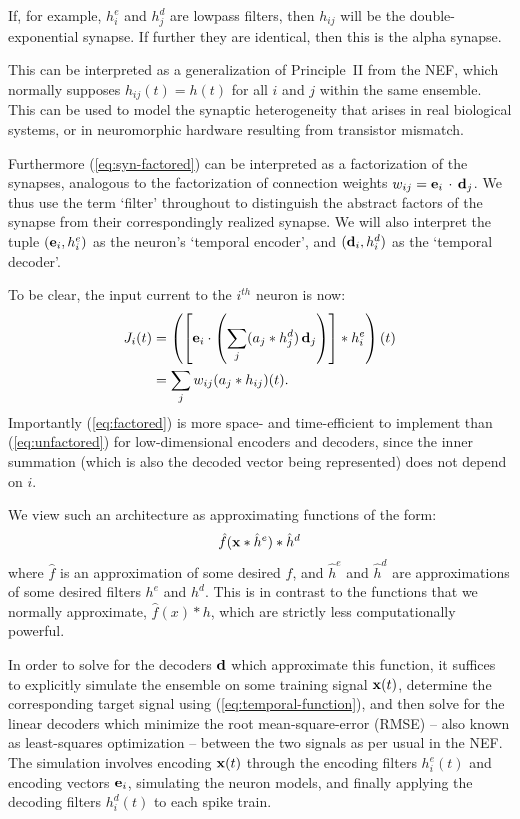 If, for example, $h^e_i$ and $h^d_j$ are lowpass filters, then $h_{ij}$ will be the double-exponential synapse. If further  they are identical, then this is the alpha synapse.

This can be interpreted as a generalization of Principle~II from the NEF, which normally supposes $h_{ij}(t) = h(t)$ for all $i$ and $j$ within the same ensemble.
This can be used to model the synaptic heterogeneity that arises in real biological systems, or in neuromorphic hardware resulting from transistor mismatch. 

Furthermore (\ref{eq:syn-factored}) can be interpreted as a factorization of the synapses, analogous to the factorization of connection weights \mbox{$w_{ij} = \mathbf{e}_i \, \cdot \, \mathbf{d}_j$}.
We thus use the term `filter' throughout to distinguish the abstract factors of the synapse from their correspondingly realized synapse.
We will also interpret the tuple $(\mathbf{e}_i, h^e_i)$ as the neuron's `temporal encoder', and $(\mathbf{d}_i, h^d_i)$ as the `temporal decoder'.

To be clear, the input current to the $i^{th}$ neuron is now:
\begin{align}
J_i(t) &= \left( \left[ \mathbf{e}_i \cdot \left( \sum_j ( a_j \ast h^d_j) \, \mathbf{d}_j \right) \right] \ast h^e_i \right)(t) \label{eq:factored} \\
       &= \sum_j w_{ij} (a_j \ast h_{ij})(t) . \label{eq:unfactored}
\end{align}
Importantly (\ref{eq:factored}) is more space- and time-efficient to implement than (\ref{eq:unfactored}) for low-dimensional encoders and decoders, since the inner summation (which is also the decoded vector being represented) does not depend on $i$.

We view such an architecture as approximating functions of the form:
\begin{equation} \label{eq:temporal-function}
\hat{f}(\mathbf{x} \ast \hat{h}^e) \ast \hat{h}^d
\end{equation}
where $\hat{f}$ is an approximation of some desired $f$, and $\hat{h}^e$ and $\hat{h}^d$ are approximations of some desired filters $h^e$ and $h^d$.
This is in contrast to the functions that we normally approximate, $\hat{f}(x) \ast h$, which are strictly less computationally powerful.

In order to solve for the decoders $\mathbf{d}$ which approximate this function, it suffices to explicitly simulate the ensemble on some training signal $\mathbf{x}(t)$, determine the corresponding target signal using (\ref{eq:temporal-function}), and then solve for the linear decoders which minimize the root mean-square-error (RMSE) -- also known as least-squares optimization -- between the two signals as per usual in the NEF.
The simulation involves encoding $\mathbf{x}(t)$ through the encoding filters $h_i^e(t)$ and encoding vectors $\mathbf{e}_i$, simulating the neuron models, and finally applying the decoding filters $h_i^d(t)$ to each spike train.

